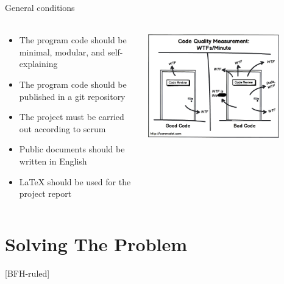 \documentclass[
    ngerman,%
    authorontitle=true,
]{bfhbeamer}
\begin{document}
    \begin{frame}{General conditions}
        \framesubtitle{}
        \begin{columns} %
            \begin{column}{0.5\textwidth} %
                \begin{itemize}
                    \item The program code should be minimal, modular, and self-explaining
                    \item The program code should be published in a git repository
                    \item The project must be carried out according to scrum
                    \item Public documents should be written in English
                    \item LaTeX should be used for the project report
                \end{itemize}
            \end{column}
            \begin{column}{0.4\textwidth} %
                \begin{center}
                    \includegraphics[width=0.8\textwidth]{pictures/clean-code-1}
                \end{center}
            \end{column}
        \end{columns}
    \end{frame}



    \section{Solving The Problem}
    [BFH-ruled]
    \frame{\sectionpage}
\end{document}
